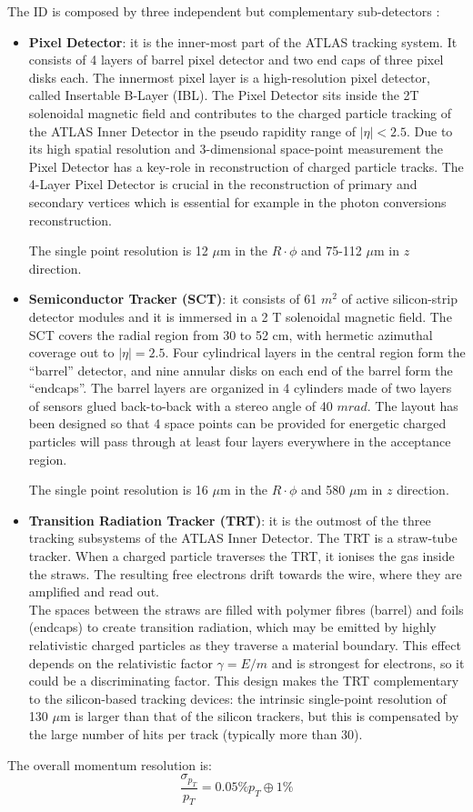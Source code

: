 \documentclass[a4paper, oneside, 11pt, openright]{book}
\begin{document}
					The ID is composed by three independent but complementary sub-detectors \cite{ID TDR}: 
					\begin{itemize}
						\item  \textbf{Pixel Detector}: 
						it is  the  inner-most  part  of  the  ATLAS  tracking  system. It consists of 4 layers of barrel pixel detector and two end caps of three pixel disks each. The innermost pixel layer is a high-resolution pixel detector,  called Insertable B-Layer (IBL). The Pixel Detector sits inside the 2T solenoidal magnetic field and contributes to the charged particle tracking of the ATLAS Inner Detector in the pseudo rapidity range of $|\eta|<2.5$. Due to its high spatial resolution and 3-dimensional space-point measurement the Pixel Detector has a key-role in reconstruction of charged particle tracks.  The 4-Layer Pixel Detector is crucial in the reconstruction of primary and secondary vertices which is essential for example in the photon conversions reconstruction. 
						
						The single point resolution is 12 $\mu$m in the $R\cdot\phi$ and 75-112 $\mu$m in $z$ direction.
						\item \textbf{Semiconductor Tracker (SCT)}: 
						it consists of 61 $m^2$ of active silicon-strip detector modules and it is immersed in a 2 T solenoidal magnetic field. The  SCT  covers  the  radial  region  from  30  to  52  cm,  with  hermetic  azimuthal  coverage  out  to $|\eta|=2.5$. Four cylindrical layers in the central region form the “barrel” detector, and nine annular disks on each end of the barrel form the “endcaps”. The barrel layers are organized in 4 cylinders made of two layers of sensors glued back-to-back with a stereo angle of 40 $mrad$. The layout has been designed so that 4 space points can be provided for energetic charged particles will pass through at least four layers everywhere in the acceptance region. 
						
						The single point resolution is 16 $\mu$m in the $R\cdot\phi$ and 580 $\mu$m in $z$ direction.
						\item \textbf{Transition Radiation Tracker (TRT)}: 
						it is the outmost of the three tracking subsystems of the ATLAS Inner Detector. The TRT is a straw-tube tracker. When a charged particle traverses the TRT, it ionises the gas inside the straws. The resulting free electrons drift towards the wire, where they are amplified and read out.\\
						The spaces between the straws are filled with polymer fibres (barrel) and foils (endcaps) to create transition radiation, which may be emitted by highly relativistic charged particles as they traverse a material boundary.   This effect depends on the relativistic factor $\gamma=E/m$ and is strongest for electrons, so it could be a discriminating factor.
						This design  makes the TRT complementary to  the silicon-based tracking devices:  the intrinsic single-point resolution of 130 $\mu$m is larger than that of the silicon trackers, but this is compensated by the large number of hits per track (typically more than 30). 
					\end{itemize}
					The overall momentum resolution is:
					$$
					\frac{\sigma_{p_T}}{p_T} = 0.05\% p_T \oplus 1\%
					$$
\end{document}

